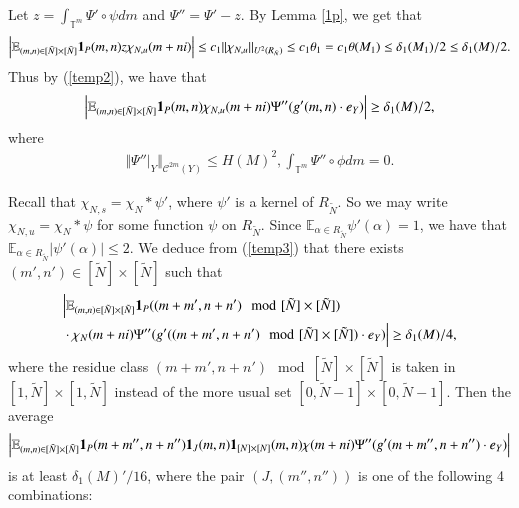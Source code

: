 \documentclass[12pt,amstex]{amsart}
\theoremstyle{definition}
\def \A {\alpha}
\def \d {\delta}
\def \R {R_{\tilde{N}}}
\begin{document}
Let $z=\int_{\mathbb{T}^{m}}\Psi'\circ\psi dm$ and $\Psi''=\Psi'-z$. By Lemma \ref{1p}, we get that
\begin{equation}\nonumber
   \begin{split}
   \Bigl\vert\mathbb{E}_{(m,n)\in [\tilde{N}]\times[\tilde{N}]}\bold{1}_{P}(m,n)z\chi_{N,u}(m+ni)\Bigr\vert
   \leq c_{1}\Vert\chi_{N,u}\Vert_{U^{2}(\R)}\leq c_{1}\theta_{1}=c_{1}\theta(M_{1})\leq \d_{1}(M_{1})/2\leq \d_{1}(M)/2.
  \end{split}
  \end{equation}
  Thus by (\ref{temp2}), we have that
  \begin{equation}\label{temp3}
   \begin{split}
   \Bigl\vert\mathbb{E}_{(m,n)\in [\tilde{N}]\times[\tilde{N}]}\bold{1}_{P}(m,n)\chi_{N,u}(m+ni)\Psi''(g'(m,n)\cdot e_{Y})\Bigr\vert\geq\d_{1}(M)/2,
  \end{split}
  \end{equation}
where
  \begin{equation}\nonumber
   \begin{split}
   \Vert\Psi''|_{Y}\Vert_{\mathcal{C}^{2m}(Y)}\leq H(M)^{2}, \int_{\mathbb{T}^{m}}\Psi''\circ\phi dm =0.
  \end{split}
  \end{equation}

Recall that $\chi_{N,s}=\chi_{N}*\psi'$, where $\psi'$ is a kernel of $\R$. So we may write $\chi_{N,u}=\chi_{N}*\psi$
for some function $\psi$ on $\R$. Since $\mathbb{E}_{\A\in \R}\psi'(\A)=1$, we have that $\mathbb{E}_{\A\in \R}\vert\psi'(\A)\vert\leq 2$.
We deduce from (\ref{temp3}) that there exists $(m',n')\in [\tilde{N}]\times[\tilde{N}]$ such that
  \begin{equation}\nonumber
   \begin{split}
   &\Bigl\vert\mathbb{E}_{(m,n)\in [\tilde{N}]\times[\tilde{N}]}\bold{1}_{P}((m+m',n+n')\mod [\tilde{N}]\times[\tilde{N}])
   \\&\cdot\chi_{N}(m+ni)\Psi''(g'((m+m',n+n')\mod [\tilde{N}]\times[\tilde{N}])\cdot e_{Y})\Bigr\vert\geq\d_{1}(M)/4,
  \end{split}
  \end{equation}
  where the residue class $(m+m',n+n')\mod [\tilde{N}]\times[\tilde{N}]$ is taken in $[1,\tilde{N}]\times[1,\tilde{N}]$ instead of the more usual set $[0,\tilde{N}-1]\times[0,\tilde{N}-1]$. Then the average
  \begin{equation}\nonumber
   \begin{split}
   \Bigl\vert\mathbb{E}_{(m,n)\in [\tilde{N}]\times[\tilde{N}]}\bold{1}_{P}(m+m'',n+n'')\bold{1}_{J}(m,n)\bold{1}_{[N]\times[N]}(m,n)\chi(m+ni)\Psi''(g'(m+m'',n+n'')\cdot e_{Y})\Bigr\vert
  \end{split}
  \end{equation}
    is at least $\d_{1}(M)'/16$, where the pair $(J,(m'',n''))$ is one of the following 4 combinations:
\end{document}
